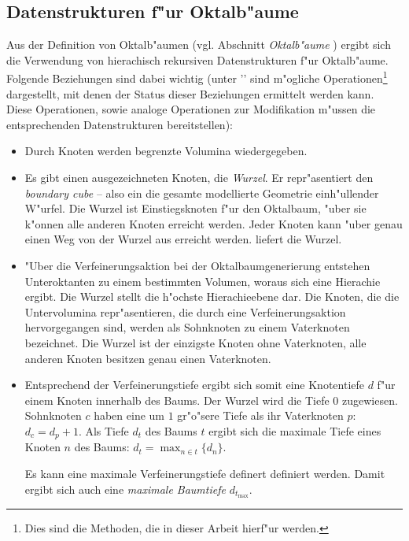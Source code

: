 \subsection{Datenstrukturen f"ur Oktalb"aume}
Aus der Definition von Oktalb"aumen (vgl. Abschnitt \emph{Oktalb"aume} 
) 
ergibt sich die Verwendung von hierachisch rekursiven Datenstrukturen f"ur 
Oktalb"aume. 
Folgende Beziehungen sind dabei wichtig (unter '\opitemlabel' sind m"ogliche 
Operationen\footnote{Dies sind die Methoden, die in dieser Arbeit hierf"ur 
werden.} 
dargestellt, mit denen der Status dieser Beziehungen ermittelt werden kann. 
Diese Operationen, sowie analoge Operationen zur Modifikation 
m"ussen die entsprechenden Datenstrukturen bereitstellen):
\begin{itemize}
\item Durch Knoten werden begrenzte Volumina wiedergegeben. 
\item Es gibt einen ausgezeichneten Knoten, die \emph{Wurzel}. Er 
    repr"asentiert den \emph{boundary cube} -- also ein die gesamte 
    modellierte Geometrie einh"ullender W"urfel. Die Wurzel ist 
    Einstiegsknoten 
f"ur den Oktalbaum, "uber sie k"onnen alle anderen Knoten 
    erreicht werden. Jeder Knoten kann "uber genau einen Weg von der Wurzel 
    aus erreicht werden.
    \oplistbeg
    \label{basis_op_beg}
    \opitem {} liefert die Wurzel.
    \oplistend
\item "Uber die Verfeinerungsaktion bei der Oktalbaumgenerierung entstehen 
    Unteroktanten zu einem bestimmten Volumen, woraus sich eine  
    Hierachie ergibt. Die Wurzel stellt die 
    h"ochste Hierachieebene dar. Die Knoten, die die Untervolumina 
    repr"asentieren, die durch eine Verfeinerungsaktion hervorgegangen sind, 
    werden als Sohnknoten zu einem Vaterknoten bezeichnet. Die Wurzel ist  
    der einzigste Knoten ohne Vaterknoten, alle anderen Knoten besitzen genau 
    einen Vaterknoten.
\item Entsprechend der Verfeinerungstiefe ergibt sich somit eine Knotentiefe 
    $d$ f"ur einem Knoten innerhalb des Baums. Der Wurzel wird die Tiefe $0$ 
    zugewiesen. Sohnknoten $c$ haben eine um $1$ gr"o"sere Tiefe als ihr 
    Vaterknoten $p$: $d_c = d_p + 1$.
    Als Tiefe $d_t$ des Baums $t$ ergibt sich die maximale Tiefe eines 
    Knoten $n$ des Baums: $d_t = \max_{n \in t} \{ d_n \}$. 

    Es kann eine maximale Verfeinerungstiefe definert definiert werden.  
    Damit ergibt sich auch eine \emph{maximale Baumtiefe} $d_{t_{\max}}$. 


\end{itemize}

